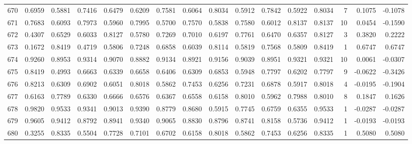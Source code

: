 \begin{tabular}{lrrrrrrrrrrrrrrr}
670 &      0.6959 &  0.5881 &  0.7416 &  0.6479 &  0.6209 &  0.7581 &  0.6064 &  0.8034 &  0.5912 &  0.7842 &   0.5922 &     0.8034 &      7 &                    0.1075 &                    -0.1078 \\
671 &      0.7683 &  0.6093 &  0.7973 &  0.5960 &  0.7995 &  0.5700 &  0.7570 &  0.5838 &  0.7580 &  0.6012 &   0.8137 &     0.8137 &     10 &                    0.0454 &                    -0.1590 \\
672 &      0.4307 &  0.6529 &  0.6033 &  0.8127 &  0.5780 &  0.7269 &  0.7010 &  0.6197 &  0.7761 &  0.6470 &   0.6357 &     0.8127 &      3 &                    0.3820 &                     0.2222 \\
673 &      0.1672 &  0.8419 &  0.4719 &  0.5806 &  0.7248 &  0.6858 &  0.6039 &  0.8114 &  0.5819 &  0.7568 &   0.5809 &     0.8419 &      1 &                    0.6747 &                     0.6747 \\
674 &      0.9260 &  0.8953 &  0.9314 &  0.9070 &  0.8882 &  0.9134 &  0.8921 &  0.9156 &  0.9039 &  0.8951 &   0.9321 &     0.9321 &     10 &                    0.0061 &                    -0.0307 \\
675 &      0.8419 &  0.4993 &  0.6663 &  0.6339 &  0.6658 &  0.6406 &  0.6309 &  0.6853 &  0.5948 &  0.7797 &   0.6202 &     0.7797 &      9 &                   -0.0622 &                    -0.3426 \\
676 &      0.8213 &  0.6309 &  0.6902 &  0.6051 &  0.8018 &  0.5862 &  0.7453 &  0.6256 &  0.7231 &  0.6878 &   0.5917 &     0.8018 &      4 &                   -0.0195 &                    -0.1904 \\
677 &      0.6163 &  0.7789 &  0.6330 &  0.6666 &  0.6576 &  0.6367 &  0.6558 &  0.6158 &  0.8010 &  0.5962 &   0.7988 &     0.8010 &      8 &                    0.1847 &                     0.1626 \\
678 &      0.9820 &  0.9533 &  0.9341 &  0.9013 &  0.9390 &  0.8779 &  0.8680 &  0.5915 &  0.7745 &  0.6759 &   0.6355 &     0.9533 &      1 &                   -0.0287 &                    -0.0287 \\
679 &      0.9605 &  0.9412 &  0.8792 &  0.8941 &  0.9340 &  0.9065 &  0.8830 &  0.8796 &  0.8741 &  0.8158 &   0.5736 &     0.9412 &      1 &                   -0.0193 &                    -0.0193 \\
680 &      0.3255 &  0.8335 &  0.5504 &  0.7728 &  0.7101 &  0.6702 &  0.6158 &  0.8018 &  0.5862 &  0.7453 &   0.6256 &     0.8335 &      1 &                    0.5080 &                     0.5080 \\

\end{tabular}
